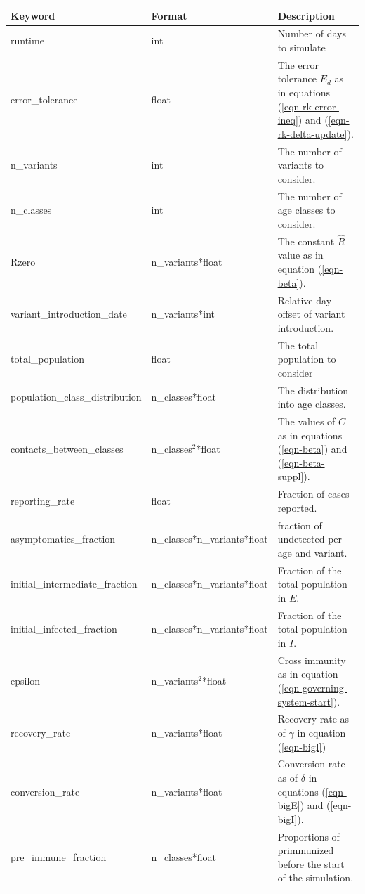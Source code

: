 \documentclass[a4paper,12pt]{article}
\begin{document}
\begin{table}
  \begin{tiny}
  \begin{tabular}{l|l|p{6cm}}
    Keyword & Format & Description  \\
    \hline
    runtime & int & Number of days to simulate \\
    error\_tolerance & float & The error tolerance $E_d$ as in
    equations (\ref{eqn-rk-error-ineq}) and
    (\ref{eqn-rk-delta-update}). \\
    n\_variants & int & The number of variants to consider. \\
    n\_classes & int & The number of age classes to consider. \\
    Rzero & n\_variants*float & The constant $\hat{R}$ value as in
    equation (\ref{eqn-beta}). \\
    variant\_introduction\_date & n\_variants*int & Relative day
    offset of variant introduction. \\
    total\_population & float & The total population to consider \\
    population\_class\_distribution & n\_classes*float & The
    distribution into age classes. \\
    contacts\_between\_classes & n\_classes$^2$*float & The values of
    $C$ as in equations (\ref{eqn-beta}) and (\ref{eqn-beta-suppl}). \\
    reporting\_rate & float & Fraction of cases reported. \\
    asymptomatics\_fraction & n\_classes*n\_variants*float & fraction
    of undetected per age and variant. \\
    initial\_intermediate\_fraction & n\_classes*n\_variants*float &
    Fraction of the total population in $E$. \\
    initial\_infected\_fraction & n\_classes*n\_variants*float &
    Fraction of the total population in $I$. \\
    epsilon & n\_variants$^2$*float & Cross immunity as in equation
    (\ref{eqn-governing-system-start}). \\
    recovery\_rate & n\_variants*float & Recovery rate as of $\gamma$ in
    equation (\ref{eqn-bigI}) \\
    conversion\_rate & n\_variants*float & Conversion rate as of
    $\delta$ in equations (\ref{eqn-bigE}) and (\ref{eqn-bigI}). \\
    pre\_immune\_fraction & n\_classes*float & Proportions of
    primmunized before the start of the simulation. \\

\end{tabular}
\end{tiny}
\end{table}
\end{document}
